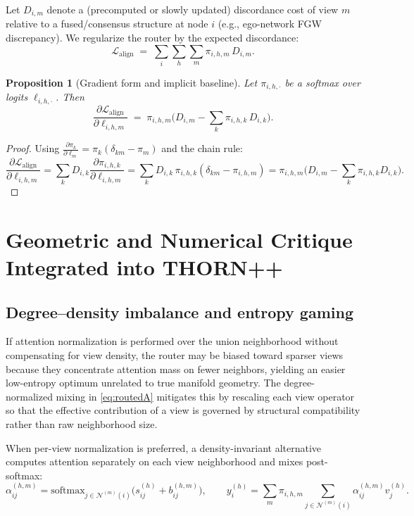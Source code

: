 \documentclass[11pt]{article}
\newtheorem{proposition}{Proposition}
\begin{document}
Let $D_{i,m}$ denote a (precomputed or slowly updated) discordance cost of view $m$ relative to a fused/consensus structure at node $i$ (e.g., ego-network FGW discrepancy). We regularize the router by the expected discordance:
\begin{equation}
\label{eq:gwroute}
\mathcal{L}_{\text{align}} \;=\; \sum_i \sum_h \sum_m \pi_{i,h,m}\, D_{i,m}.
\end{equation}

\begin{proposition}[Gradient form and implicit baseline]
\label{prop:reinforce}
Let $\pi_{i,h,\cdot}$ be a softmax over logits $\ell_{i,h,\cdot}$. Then
\[
\frac{\partial \mathcal{L}_{\text{align}}}{\partial \ell_{i,h,m}}
\;=\;
\pi_{i,h,m}\Big( D_{i,m} - \sum_{k}\pi_{i,h,k}\,D_{i,k}\Big).
\]
\end{proposition}

\begin{proof}
Using $\frac{\partial \pi_k}{\partial \ell_m}=\pi_k(\delta_{km}-\pi_m)$ and the chain rule:
\[
\frac{\partial \mathcal{L}_{\text{align}}}{\partial \ell_{i,h,m}}
=
\sum_k D_{i,k}\frac{\partial \pi_{i,h,k}}{\partial \ell_{i,h,m}}
=
\sum_k D_{i,k}\,\pi_{i,h,k}(\delta_{km}-\pi_{i,h,m})
=
\pi_{i,h,m}\Big(D_{i,m}-\sum_k \pi_{i,h,k}D_{i,k}\Big).
\]
\end{proof}

\section{Geometric and Numerical Critique Integrated into THORN++}

\subsection{Degree--density imbalance and entropy gaming}

If attention normalization is performed over the union neighborhood without compensating for view density, the router may be biased toward sparser views because they concentrate attention mass on fewer neighbors, yielding an easier low-entropy optimum unrelated to true manifold geometry. The degree-normalized mixing in \eqref{eq:routedA} mitigates this by rescaling each view operator so that the effective contribution of a view is governed by structural compatibility rather than raw neighborhood size.

When per-view normalization is preferred, a density-invariant alternative computes attention separately on each view neighborhood and mixes post-softmax:
\[
\alpha_{ij}^{(h,m)}=\mathrm{softmax}_{j\in\mathcal{N}^{(m)}(i)}\big(s_{ij}^{(h)}+b_{ij}^{(h,m)}\big),
\qquad
y_i^{(h)}=\sum_m \pi_{i,h,m}\sum_{j\in\mathcal{N}^{(m)}(i)}\alpha_{ij}^{(h,m)}v_j^{(h)}.
\]
\end{document}
